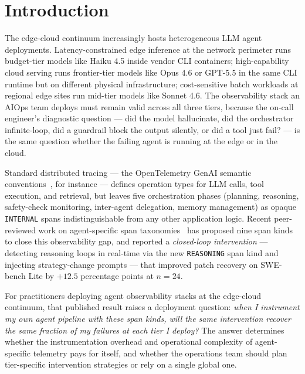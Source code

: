\documentclass[journal]{IEEEtran}
\begin{document}
\section{Introduction}

The edge-cloud continuum increasingly hosts heterogeneous LLM agent deployments. Latency-constrained edge inference at the network perimeter runs budget-tier models like Haiku 4.5 inside vendor CLI containers; high-capability cloud serving runs frontier-tier models like Opus 4.6 or GPT-5.5 in the same CLI runtime but on different physical infrastructure; cost-sensitive batch workloads at regional edge sites run mid-tier models like Sonnet 4.6. The observability stack an AIOps team deploys must remain valid across all three tiers, because the on-call engineer's diagnostic question --- did the model hallucinate, did the orchestrator infinite-loop, did a guardrail block the output silently, or did a tool just fail? --- is the same question whether the failing agent is running at the edge or in the cloud.

Standard distributed tracing --- the OpenTelemetry GenAI semantic conventions~\cite{otel}, for instance --- defines operation types for LLM calls, tool execution, and retrieval, but leaves five orchestration phases (planning, reasoning, safety-check monitoring, inter-agent delegation, memory management) as opaque \texttt{INTERNAL} spans indistinguishable from any other application logic. Recent peer-reviewed work on agent-specific span taxonomies~\cite{aiware2026} has proposed nine span kinds to close this observability gap, and reported a \emph{closed-loop intervention} --- detecting reasoning loops in real-time via the new \texttt{REASONING} span kind and injecting strategy-change prompts --- that improved patch recovery on SWE-bench Lite by $+12.5$ percentage points at $n{=}24$.

For practitioners deploying agent observability stacks at the edge-cloud continuum, that published result raises a deployment question: \emph{when I instrument my own agent pipeline with these span kinds, will the same intervention recover the same fraction of my failures at each tier I deploy?} The answer determines whether the instrumentation overhead and operational complexity of agent-specific telemetry pays for itself, and whether the operations team should plan tier-specific intervention strategies or rely on a single global one.
\end{document}
